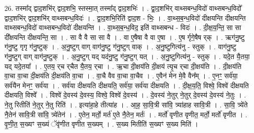 \documentclass[17pt]{extarticle}
\begin{document}
26. तस्मा᳚द् द्वाद॒शभि॑र् द्वाद॒शभि॒ स्तस्मा॒त् तस्मा᳚द् द्वाद॒शभिः॑ । . द्वा॒द॒शभि॑र् वाथ्सबन्ध॒विदो॑ वाथ्सबन्ध॒विदो᳚ द्वाद॒शभि॑र् द्वाद॒शभि॑र् वाथ्सबन्ध॒विदः॑ । . द्वा॒द॒शभि॒रिति॑ द्वाद॒श - भिः॒ । . वा॒थ्स॒ब॒न्ध॒विदो॑ दीक्षयन्ति दीक्षयन्ति वाथ्सबन्ध॒विदो॑ वाथ्सबन्ध॒विदो॑ दीक्षयन्ति । . वा॒थ्स॒ब॒न्ध॒विद॒ इति॑ वाथ्सबन्ध - विदः॑ । . दी॒क्ष॒य॒न्ति॒ सा सा दी᳚क्षयन्ति दीक्षयन्ति॒ सा । . सा वै वै सा सा वै । . वा ए॒षैषा वै वा ए॒षा । . ए॒ष र्गृगे॒षैष र्‌क् । . ऋग॑नु॒ष्टु ग॑नु॒ष्टु गृगृ ग॑नु॒ष्टुक् । . अ॒नु॒ष्टुग् वाग् वाग॑नु॒ष्टु ग॑नु॒ष्टुग् वाक् । . अ॒नु॒ष्टुगित्य॑नु - स्तुक् । . वाग॑नु॒ष्टु ग॑नु॒ष्टुग् वाग् वाग॑नु॒ष्टुक् । . अ॒नु॒ष्टुग् यद् यद॑नु॒ष्टु ग॑नु॒ष्टुग् यत् । . अ॒नु॒ष्टुगित्य॑नु - स्तुक् । . यदे॒त यै॒तया॒ यद् यदे॒तया᳚ । . ए॒तय॒ र्‌च र्‌चैत यै॒तय॒ र्‌चा । . ऋ॒चा दी॒क्षय॑ति दी॒क्षय॑ त्यृ॒च र्‌चा दी॒क्षय॑ति । . दी॒क्षय॑ति वा॒चा वा॒चा दी॒क्षय॑ति दी॒क्षय॑ति वा॒चा । . वा॒चै वैव वा॒चा वा॒चैव । . ए॒वैन॑ मेन मे॒वै वैन᳚म् । . ए॒नꣳ॒॒ सर्व॑या॒ सर्व॑यैन मेनꣳ॒॒ सर्व॑या । . सर्व॑या दीक्षयति दीक्षयति॒ सर्व॑या॒ सर्व॑या दीक्षयति । . दी॒क्ष॒य॒ति॒ विश्वे॒ विश्वे॑ दीक्षयति दीक्षयति॒ विश्वे᳚ । . विश्वे॑ दे॒वस्य॑ दे॒वस्य॒ विश्वे॒ विश्वे॑ दे॒वस्य॑ । . दे॒वस्य॑ ने॒तुर् ने॒तुर् दे॒वस्य॑ दे॒वस्य॑ ने॒तुः । . ने॒तु रितीति॑ ने॒तुर् ने॒तु रिति॑ । . इत्या॑हा॒हे तीत्या॑ह । . आ॒ह॒ सा॒वि॒त्री सा॑वि॒ त्र्या॑हाह सावि॒त्री । . सा॒वि॒ त्र्ये॑ते नै॒तेन॑ सावि॒त्री सा॑वि॒ त्र्ये॑तेन॑ । . ए॒तेन॒ मर्तो॒ मर्त॑ ए॒ते नै॒तेन॒ मर्तः॑ । . मर्तो॑ वृणीत वृणीत॒ मर्तो॒ मर्तो॑ वृणीत । . वृ॒णी॒त॒ स॒ख्यꣳ स॒ख्यं ॅवृ॑णीत वृणीत स॒ख्यम् । . स॒ख्य मितीति॑ स॒ख्यꣳ स॒ख्य मिति॑ । \newline
\end{document}
